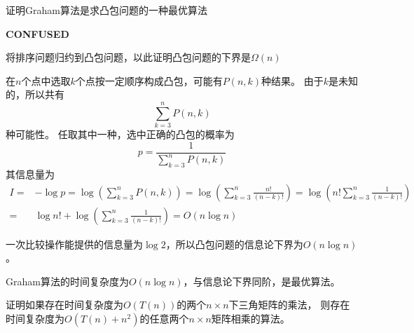 \begin{questions}
\begin{solution}
    \end{solution}

    \question  证明Graham算法是求凸包问题的一种最优算法

    \begin{solution}

        \textbf{CONFUSED}

        将排序问题归约到凸包问题，以此证明凸包问题的下界是$\Omega(n)$

    \end{solution}

    \begin{solution}
        在$n$个点中选取$k$个点按一定顺序构成凸包，可能有$P(n, k)$种结果。
        由于$k$是未知的，所以共有\[
            \sum_{k = 3}^{n} P(n,k)
        \]种可能性。
        任取其中一种，选中正确的凸包的概率为\[
            p = \frac{1}{\sum_{k = 3}^{n} P(n,k)}
        \]
        其信息量为
        \begin{align*}
            I = & - \log p = \log \left( \sum_{k = 3}^{n} P(n,k) \right)
            = \log \left( \sum_{k = 3}^{n} \frac{n!}{(n-k)!} \right)
            =  \log \left( n! \sum_{k = 3}^{n} \frac{1}{(n-k)!} \right)          \\
            =   & \log n! + \log \left(\sum_{k = 3}^{n} \frac{1}{(n-k)!} \right)
            =  O(n \log n)
        \end{align*}

        一次比较操作能提供的信息量为$\log 2$，所以凸包问题的信息论下界为$O(n \log n)$。

        Graham算法的时间复杂度为$O(n\log n)$，与信息论下界同阶，是最优算法。

    \end{solution}

    \question 证明如果存在时间复杂度为$O(T(n))$的两个$n \times n$下三角矩阵的乘法，
    则存在时间复杂度为$O(T(n)+n^2)$的任意两个$n \times n$矩阵相乘的算法。


\end{questions}
